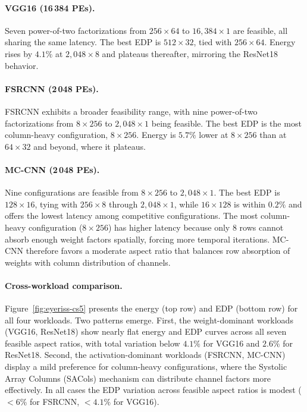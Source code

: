 \paragraph{VGG16 (16\,384 PEs).}
Seven power-of-two factorizations from $256 \times 64$ to
$16{,}384 \times 1$ are feasible, all sharing the same latency.
The best EDP is $512 \times 32$, tied with $256 \times 64$.
Energy rises by $4.1\%$ at
$2{,}048 \times 8$ and plateaus thereafter, mirroring the ResNet18
behavior.

\paragraph{FSRCNN (2\,048 PEs).}
FSRCNN exhibits a broader feasibility range, with nine
power-of-two factorizations from $8 \times 256$ to $2{,}048 \times 1$
being feasible.
The best EDP is the most column-heavy configuration,
$8 \times 256$.
Energy is $5.7\%$ lower at $8 \times 256$ than at $64 \times 32$ and
beyond, where it plateaus.


\paragraph{MC-CNN (2\,048 PEs).}
Nine configurations are feasible from $8 \times 256$ to $2{,}048 \times 1$.
The best EDP is $128 \times 16$, tying with $256 \times 8$ through
$2{,}048 \times 1$, while $16 \times 128$ is within $0.2\%$
and offers the lowest latency among competitive configurations.
The most column-heavy configuration ($8 \times 256$) has higher latency because only 8 rows cannot absorb enough
weight factors spatially, forcing more temporal iterations.
MC-CNN therefore favors a moderate aspect ratio that balances row
absorption of weights with column distribution of channels.


\paragraph{Cross-workload comparison.}
Figure~\ref{fig:eyeriss-cs5} presents the energy (top row) and EDP
(bottom row) for all four workloads.
Two patterns emerge.
First, the weight-dominant workloads (VGG16, ResNet18) show nearly
flat energy and EDP curves across all seven feasible aspect ratios,
with total variation below $4.1\%$ for VGG16 and $2.6\%$ for
ResNet18.
Second, the activation-dominant workloads (FSRCNN, MC-CNN) display
a mild preference for column-heavy configurations, where the Systolic Array Columns (SACols)
mechanism can distribute channel factors more effectively.
In all cases the EDP variation across feasible aspect ratios is
modest ($< 6\%$ for FSRCNN, $< 4.1\%$ for VGG16).

